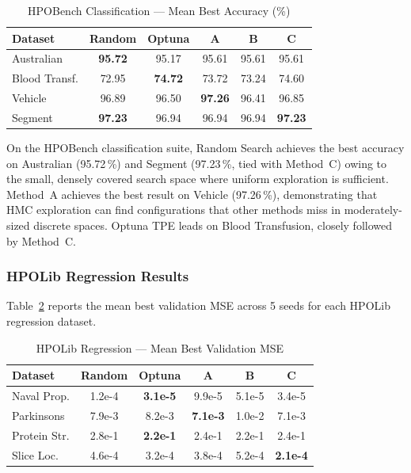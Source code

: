 \documentclass[11pt]{article}
\begin{document}
\begin{table}[H]
\centering
\caption{HPOBench Classification — Mean Best Accuracy (\%)}
\label{tab:hpobench_class}
\renewcommand{\arraystretch}{1.15}
\begin{tabular}{lccccc}
\toprule
\textbf{Dataset} & \textbf{Random} & \textbf{Optuna} & \textbf{A} & \textbf{B} & \textbf{C} \\
\midrule
Australian        & \textbf{95.72} & 95.17 & 95.61 & 95.61 & 95.61 \\
Blood Transf.     & 72.95 & \textbf{74.72} & 73.72 & 73.24 & 74.60 \\
Vehicle           & 96.89 & 96.50 & \textbf{97.26} & 96.41 & 96.85 \\
Segment           & \textbf{97.23} & 96.94 & 96.94 & 96.94 & \textbf{97.23} \\
\bottomrule
\end{tabular}
\end{table}

On the HPOBench classification suite, Random Search achieves the best
accuracy on Australian (95.72\,\%) and Segment (97.23\,\%, tied with
Method~C) owing to the small, densely covered search space where
uniform exploration is sufficient.  Method~A achieves the best result
on Vehicle (97.26\,\%), demonstrating that HMC exploration can find
configurations that other methods miss in moderately-sized discrete
spaces.  Optuna TPE leads on Blood Transfusion, closely followed by
Method~C.

\subsubsection{HPOLib Regression Results}

Table~\ref{tab:hpolib_reg} reports the mean best validation MSE
across 5 seeds for each HPOLib regression dataset.

\begin{table}[H]
\centering
\caption{HPOLib Regression — Mean Best Validation MSE}
\label{tab:hpolib_reg}
\renewcommand{\arraystretch}{1.15}
\begin{tabular}{lccccc}
\toprule
\textbf{Dataset} & \textbf{Random} & \textbf{Optuna} & \textbf{A} & \textbf{B} & \textbf{C} \\
\midrule
Naval Prop.     & 1.2e-4 & \textbf{3.1e-5} & 9.9e-5 & 5.1e-5 & 3.4e-5 \\
Parkinsons      & 7.9e-3 & 8.2e-3 & \textbf{7.1e-3} & 1.0e-2 & 7.1e-3 \\
Protein Str.    & 2.8e-1 & \textbf{2.2e-1} & 2.4e-1 & 2.2e-1 & 2.4e-1 \\
Slice Loc.      & 4.6e-4 & 3.2e-4 & 3.8e-4 & 5.2e-4 & \textbf{2.1e-4} \\
\bottomrule
\end{tabular}
\end{table}
\end{document}
